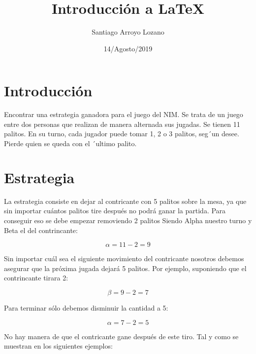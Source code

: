 \documentclass[12pt]{article}
\begin{document}
  \maketitle
  \title{Introducción a \LaTeX{}}
  \author{Santiago Arroyo Lozano}
  \date{14/Agosto/2019}


  \section{Introducción}
  Encontrar una estrategia ganadora para el juego del NIM.
  Se trata de un juego entre dos personas que realizan de
  manera alternada sus jugadas. Se tienen 11 palitos. En su
  turno, cada jugador puede tomar 1, 2 o 3 palitos, seg´un
  desee. Pierde quien se queda con el ´ultimo palito.

  \section{Estrategia}
  La estrategia consiste en dejar al contricante con 5 palitos sobre la mesa, ya que sin importar cuántos palitos tire después no podrá ganar la partida. Para conseguir eso se debe empezar removiendo 2 palitos
  Siendo Alpha nuestro turno y Beta el del contrincante:

  \begin{equation}
    \label{paso1}
    \alpha = 11 - 2 = 9
  \end{equation}

  Sin importar cuál sea el siguiente movimiento del contricante nosotros debemos asegurar que la próxima jugada dejará 5 palitos.
  Por ejemplo, suponiendo que el contrincante tirara 2:

  \begin{equation}
    \label{paso2}
    \beta = 9 - 2 = 7
  \end{equation}

  Para terminar sólo debemos disminuir la cantidad a 5:

  \begin{equation}
    \label{paso3}
    \alpha = 7 - 2 = 5
  \end{equation}

  No hay manera de que el contricante gane después de este tiro. Tal y como se muestran en los siguientes ejemplos:
\end{document}
